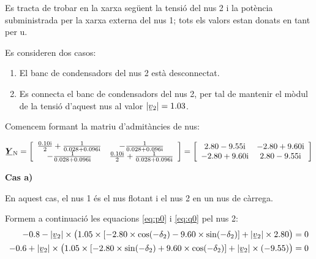 \break
\begin{exemple}\label{ex:ControlTensCond}
	\addcontentsxms{\ControlTensCond}
    Es tracta de trobar en la xarxa següent la tensió del nus 2 i la
    potència subministrada per la xarxa externa del nus 1; tots els valors   estan donats en tant per u.

    Es consideren dos casos:
    \begin{enumerate}
       \renewcommand{\labelenumi}{\alph{enumi})}
       \item El banc de condensadors del nus 2 està desconnectat.
       \item Es connecta el banc de condensadors del nus 2, per tal de mantenir el mòdul de
       la tensió d'aquest nus al valor $|\cmplx{v}_2|=\num{1,03}$.
    \end{enumerate}

 	\begin{center}
		
	\end{center}

    Comencem formant la matriu d'admitàncies de nus:

    \[
    \mcmplx{Y}\ped{N} = 
    \begin{bmatrix}\begin{array}{cc} 
      \frac{\complexnum{j 0,10}}{2} + \frac{1}{\complexnum{0,028+j0,096}} & -\frac{1}{\complexnum{0,028+j0,096}} \\
      -\frac{1}{\complexnum{0,028+j0,096}} & \frac{\complexnum{j 0,10}}{2} + \frac{1}{\complexnum{0,028+j0,096}} \\
     \end{array}\end{bmatrix} =
    \begin{bmatrix}\begin{array}{cc} 
      \complexnum{2,80 -j9,55} & \complexnum{-2,80 +j9,60} \\
      \complexnum{-2,80 +j9,60} & \complexnum{2,80 -j9,55} \\
    \end{array}\end{bmatrix}
    \]

    \textbf{Cas a)}

     En aquest cas, el nus 1 és el nus flotant i el nus 2 en un nus
    de càrrega.

    Formem a continuació les equacions \eqref{eq:p0} i \eqref{eq:q0} pel
    nus 2:
    \begin{align*}
    \num{-0,8} - |\cmplx{v}_2| \times \bigl( \num{1,05}\times [\num{-2,80}\times \cos(-\delta_2) - \num{9,60} \times
    \sin( -\delta_2)]  + |\cmplx{v}_2| \times \num{2,80} \bigr) &= 0 \\
    -\num{0,6} + |\cmplx{v}_2| \times\bigl( \num{1,05} \times[-\num{2,80}\times\sin(-\delta_2) +
    \num{9,60}\times\cos( -\delta_2)]  + |\cmplx{v}_2|\times (-\num{9,55}) \bigr) &= 0
    \end{align*}


\end{exemple}
